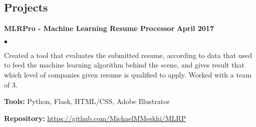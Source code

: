 \documentclass[margin,line]{res}
\newenvironment{list2}{
  \begin{list}{$\bullet$}{%
      \setlength{\itemsep}{0in}
      \setlength{\parsep}{0in} \setlength{\parskip}{0in}
      \setlength{\topsep}{0in} \setlength{\partopsep}{0in} 
      \setlength{\leftmargin}{0.2in}}}{\end{list}}
\begin{document}
\begin{resume}

%

%



\section{\sc Projects}


{\bf MLRPro - Machine Learning Resume Processor} \hfill {\bf April 2017}\\
\vspace{-.3cm}
\begin{list2}
\item Created a tool that evaluates the submitted resume, according to data that used to feed the machine learning algorithm behind the scene, and gives result that which level of companies given resume is qualified to apply. Worked with a team of 3.
\item \textbf{Tools:} Python, Flask, HTML/CSS, Adobe Illustrator
\item \textbf{Repository:} \href{https://github.com/MichaelMMeskhi/MLRP}{https://github.com/MichaelMMeskhi/MLRP}
\end{list2}


\end{resume}
\end{document}
